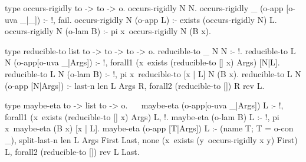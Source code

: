 \begin{elpicode}
  type occurs-rigidly to -> to -> o.
  occurs-rigidly N N.
  occurs-rigidly _ (o-app [o-uva _|_]) :- !, fail.
  occurs-rigidly N (o-app L) :- exists (occurs-rigidly N) L.
  occurs-rigidly N (o-lam B) :- pi x\ occurs-rigidly N (B x).

  type reducible-to list to -> to -> to -> o.
  reducible-to _ N N :- !.
  reducible-to L N (o-app[o-uva _|Args]) :- !, 
    forall1 (x\ exists (reducible-to [] x) Args) [N|L]. 
  reducible-to L N (o-lam B) :- !, 
    pi x\ reducible-to [x | L] N (B x).
  reducible-to L N (o-app [N|Args]) :-
    last-n {len L} Args R,
    forall2 (reducible-to []) R {rev L}.

  type maybe-eta to -> list to -> o.                  ~~
  maybe-eta (o-app[o-uva _|Args]) L :- !,
    forall1 (x\ exists (reducible-to [] x) Args) L, !. 
  maybe-eta (o-lam B) L :- !, pi x\ maybe-eta (B x) [x | L].
  maybe-eta (o-app [T|Args]) L :- (name T; T = o-con _),
    split-last-n {len L} Args First Last,
    none (x\ exists (y\ occurs-rigidly x y) First) L,
    forall2 (reducible-to []) {rev L} Last.
\end{elpicode}
